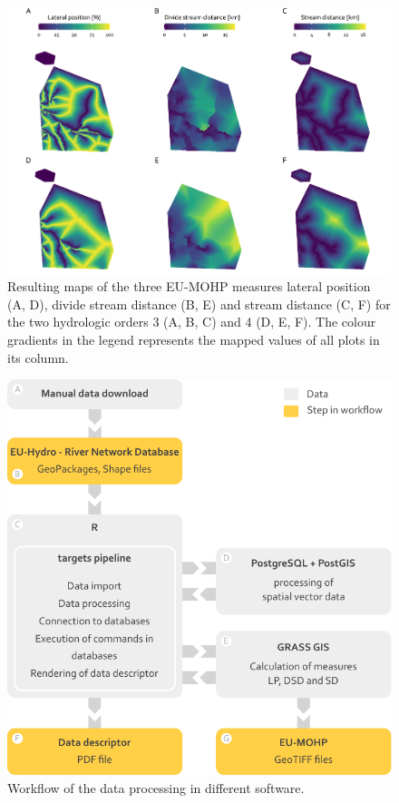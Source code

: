 \documentclass[fleqn,10pt]{wlscirep}
\begin{document}
\normalsize

\renewcommand{\arraystretch}{1}

\footnotesize

\begin{figure}[H]

{\centering \includegraphics[width=1\linewidth]{data_descriptor/tex/figure-datasetmapoverviewplot-1} 

}

\caption{Resulting maps of the three EU-MOHP measures lateral position (A, D), divide stream distance (B, E) and stream distance (C, F) for the two hydrologic orders 3 (A, B, C) and 4 (D, E, F). The colour gradients in the legend represents the mapped values of all plots in its column.}\label{fig:datasetmapoverviewplot}
\end{figure}

\normalsize

\footnotesize

\begin{figure}[H]

{\centering \includegraphics[width=0.7\linewidth]{data_descriptor/tex/workflow_figure} 

}

\caption{Workflow of the data processing in different software.}\label{fig:workflowfigure}
\end{figure}
\end{document}
